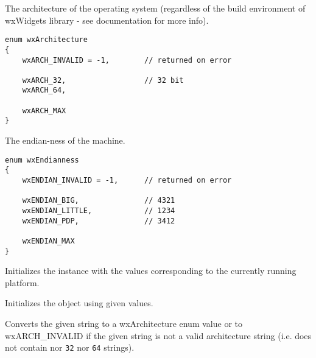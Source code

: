 The architecture of the operating system (regardless of the build environment
of wxWidgets library - see  documentation
for more info).

\begin{verbatim}
enum wxArchitecture
{
    wxARCH_INVALID = -1,        // returned on error

    wxARCH_32,                  // 32 bit
    wxARCH_64,

    wxARCH_MAX
}
\end{verbatim}

The endian-ness of the machine.

\begin{verbatim}
enum wxEndianness
{
    wxENDIAN_INVALID = -1,      // returned on error

    wxENDIAN_BIG,               // 4321
    wxENDIAN_LITTLE,            // 1234
    wxENDIAN_PDP,               // 3412

    wxENDIAN_MAX
}
\end{verbatim}



\label{wxplatforminfowxplatforminfo}


Initializes the instance with the values corresponding to the currently running platform.


Initializes the object using given values.




\label{wxplatforminfogetarch}


Converts the given string to a wxArchitecture enum value or to
wxARCH_INVALID if the given string is not a valid architecture string
(i.e. does not contain nor {\tt 32} nor {\tt 64} strings).


\label{wxplatforminfogetarchname}

